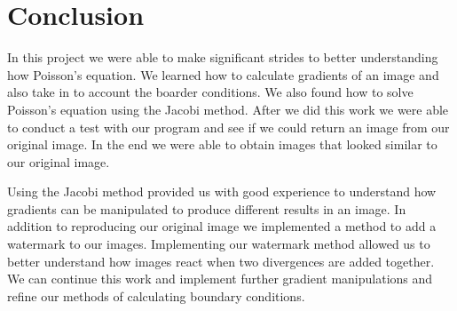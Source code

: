 \documentclass[10pt,twopage]{acmsiggraph}
\begin{document}
\section{Conclusion}

In this project we were able to make significant strides to better understanding how Poisson's equation. We learned how to calculate gradients of an image and also take in to account the boarder conditions. We also found how to solve Poisson's equation using the Jacobi method. After we did this work we were able to conduct a test with our program and see if we could return an image from our original image. In the end we were able to obtain images that looked similar to our original image.

Using the Jacobi method provided us with good experience to understand how gradients can be manipulated to produce different results in an image.  In addition to reproducing our original image we implemented a method to add a watermark to our images. Implementing our watermark method allowed us to better understand how images react when two divergences are added together. We can continue this work and implement further gradient manipulations and refine our methods of calculating boundary conditions.






{\small}

%
%


\cleardoublepage
\end{document}
